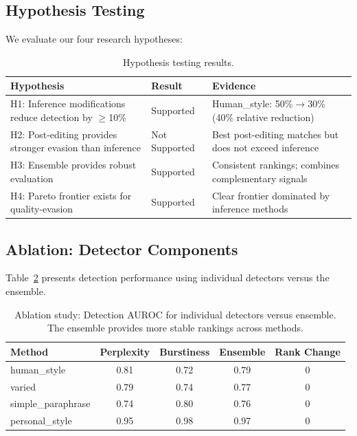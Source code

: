 \subsection{Hypothesis Testing}

We evaluate our four research hypotheses:

\begin{table}[h]
\centering
\caption{Hypothesis testing results.}
\label{tab:hypotheses}
\small
\begin{tabular}{@{}p{7cm}lp{4cm}@{}}
\toprule
\textbf{Hypothesis} & \textbf{Result} & \textbf{Evidence} \\
\midrule
H1: Inference modifications reduce detection by $\geq$10\% & Supported & Human\_style: 50\%$\rightarrow$30\% (40\% relative reduction) \\
H2: Post-editing provides stronger evasion than inference & Not Supported & Best post-editing matches but does not exceed inference \\
H3: Ensemble provides robust evaluation & Supported & Consistent rankings; combines complementary signals \\
H4: Pareto frontier exists for quality-evasion & Supported & Clear frontier dominated by inference methods \\
\bottomrule
\end{tabular}
\end{table}

\subsection{Ablation: Detector Components}

Table~\ref{tab:ablation} presents detection performance using individual detectors versus the ensemble.

\begin{table}[h]
\centering
\caption{Ablation study: Detection AUROC for individual detectors versus ensemble. The ensemble provides more stable rankings across methods.}
\label{tab:ablation}
\small
\begin{tabular}{@{}lcccc@{}}
\toprule
\textbf{Method} & \textbf{Perplexity} & \textbf{Burstiness} & \textbf{Ensemble} & \textbf{Rank Change} \\
\midrule
human\_style & 0.81 & 0.72 & 0.79 & 0 \\
varied & 0.79 & 0.74 & 0.77 & 0 \\
simple\_paraphrase & 0.74 & 0.80 & 0.76 & 0 \\
personal\_style & 0.95 & 0.98 & 0.97 & 0 \\
\bottomrule
\end{tabular}
\end{table}

